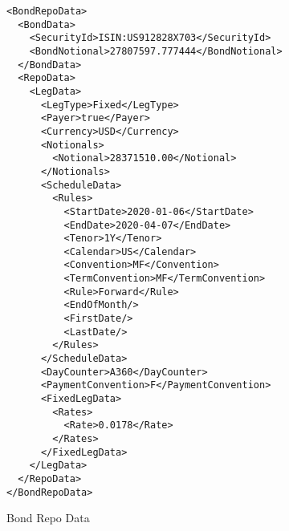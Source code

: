 \begin{listing}[H]
\begin{verbatim}
<BondRepoData>
  <BondData>
    <SecurityId>ISIN:US912828X703</SecurityId>
    <BondNotional>27807597.777444</BondNotional>
  </BondData>
  <RepoData>
    <LegData>
      <LegType>Fixed</LegType>
      <Payer>true</Payer>
      <Currency>USD</Currency>
      <Notionals>
        <Notional>28371510.00</Notional>
      </Notionals>
      <ScheduleData>
        <Rules>
          <StartDate>2020-01-06</StartDate>
          <EndDate>2020-04-07</EndDate>
          <Tenor>1Y</Tenor>
          <Calendar>US</Calendar>
          <Convention>MF</Convention>
          <TermConvention>MF</TermConvention>
          <Rule>Forward</Rule>
          <EndOfMonth/>
          <FirstDate/>
          <LastDate/>
        </Rules>
      </ScheduleData>
      <DayCounter>A360</DayCounter>
      <PaymentConvention>F</PaymentConvention>
      <FixedLegData>
        <Rates>
          <Rate>0.0178</Rate>
        </Rates>
      </FixedLegData>
    </LegData>
  </RepoData>
</BondRepoData>
\end{verbatim}
\caption{Bond Repo Data}
\label{lst:bondrepodata}
\end{listing}
